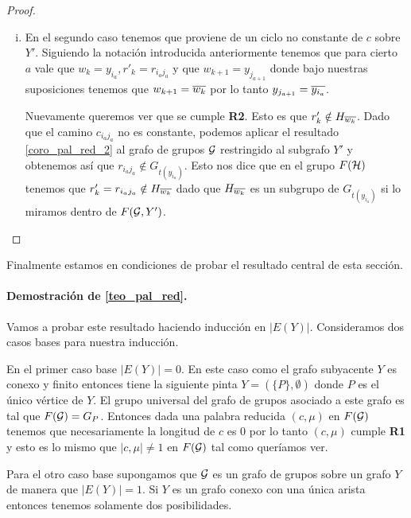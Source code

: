 \documentclass[tesis.tex]{subfiles}
\begin{document}
\begin{proof}
\begin{enumerate}[i)]
		\item En el segundo caso tenemos que proviene de un ciclo no constante de $c$ sobre $Y'$. 
		Siguiendo la notación introducida anteriormente tenemos que para cierto $a$ vale que $w_k = y_{i_a}, r'_k = r_{i_aj_a}$ y que $w_{k+1} = y_{j_{a+1}}$ donde bajo nuestras suposiciones tenemos que $w_{k+1} = \overline{w_{k}}$ por lo tanto $ y_{j_{a+1}} = \overline{y_{i_a}}$.
		
		Nuevamente queremos ver que se cumple \textbf{R2}. 
		Esto es que $r'_k \notin H_{\overline{w_k}}$.		
		Dado que el camino $c_{i_aj_a}$ no es constante, podemos aplicar el resultado \ref{coro_pal_red_2} al grafo de grupos ${\cal G}$ restringido al subgrafo $Y'$ y obtenemos así que $r_{i_aj_a} \notin G_{t(y_{i_a})}$.
		Esto nos dice que en el grupo $F({\cal H})$ tenemos que $r'_{k} = r_{i_aj_a} \notin H_{\overline{w_k}}$ dado que $H_{\overline{w_k}}$ es un subgrupo de $G_{t(y_{i_a})}$ si lo miramos dentro de $F({\cal G}, Y')$. 
	\end{enumerate}	
\end{proof}

Finalmente estamos en condiciones de probar el resultado central de esta sección. 


\paragraph{Demostración de \ref{teo_pal_red}.}
Vamos a probar este resultado haciendo inducción en $|E(Y)|$.
Consideramos dos casos bases para nuestra inducción.


En el primer caso base $|E(Y)| = 0$.
En este caso como el grafo subyacente $Y$ es conexo y finito entonces tiene la siguiente pinta $Y = (\{ P \}, \emptyset)$ donde $P$ es el único vértice de $Y$.
El grupo universal del grafo de grupos asociado a este grafo es tal que 
$F({\cal G}) = G_{P}$. 
Entonces dada una palabra reducida $(c, \mu)$ en $F({\cal G})$ tenemos que necesariamente la longitud de $c$ es $0$ por lo tanto $(c,\mu)$ cumple \textbf{R1} y esto es lo mismo que $|c,\mu| \neq 1$ en $F({\cal G})$ tal como queríamos ver.



Para el otro caso base supongamos que ${\cal G}$ es un grafo de grupos sobre un grafo $Y$ de manera que $|E(Y)| = 1$.
Si $Y$ es un grafo conexo con una única arista entonces tenemos solamente dos posibilidades.
\end{document}
